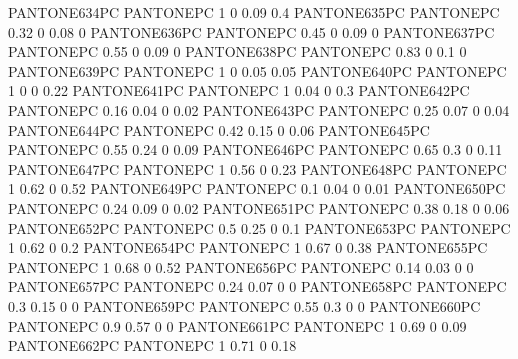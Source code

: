  {PANTONE634PC} {PANTONE\SpotSpace PC} {1 0 0.09 0.4}
 {PANTONE635PC} {PANTONE\SpotSpace PC} {0.32 0 0.08 0}
 {PANTONE636PC} {PANTONE\SpotSpace PC} {0.45 0 0.09 0}
 {PANTONE637PC} {PANTONE\SpotSpace PC} {0.55 0 0.09 0}
 {PANTONE638PC} {PANTONE\SpotSpace PC} {0.83 0 0.1 0}
 {PANTONE639PC} {PANTONE\SpotSpace PC} {1 0 0.05 0.05}
 {PANTONE640PC} {PANTONE\SpotSpace PC} {1 0 0 0.22}
 {PANTONE641PC} {PANTONE\SpotSpace PC} {1 0.04 0 0.3}
 {PANTONE642PC} {PANTONE\SpotSpace PC} {0.16 0.04 0 0.02}
 {PANTONE643PC} {PANTONE\SpotSpace PC} {0.25 0.07 0 0.04}
 {PANTONE644PC} {PANTONE\SpotSpace PC} {0.42 0.15 0 0.06}
 {PANTONE645PC} {PANTONE\SpotSpace PC} {0.55 0.24 0 0.09}
 {PANTONE646PC} {PANTONE\SpotSpace PC} {0.65 0.3 0 0.11}
 {PANTONE647PC} {PANTONE\SpotSpace PC} {1 0.56 0 0.23}
 {PANTONE648PC} {PANTONE\SpotSpace PC} {1 0.62 0 0.52}
 {PANTONE649PC} {PANTONE\SpotSpace PC} {0.1 0.04 0 0.01}
 {PANTONE650PC} {PANTONE\SpotSpace PC} {0.24 0.09 0 0.02}
 {PANTONE651PC} {PANTONE\SpotSpace PC} {0.38 0.18 0 0.06}
 {PANTONE652PC} {PANTONE\SpotSpace PC} {0.5 0.25 0 0.1}
 {PANTONE653PC} {PANTONE\SpotSpace PC} {1 0.62 0 0.2}
 {PANTONE654PC} {PANTONE\SpotSpace PC} {1 0.67 0 0.38}
 {PANTONE655PC} {PANTONE\SpotSpace PC} {1 0.68 0 0.52}
 {PANTONE656PC} {PANTONE\SpotSpace PC} {0.14 0.03 0 0}
 {PANTONE657PC} {PANTONE\SpotSpace PC} {0.24 0.07 0 0}
 {PANTONE658PC} {PANTONE\SpotSpace PC} {0.3 0.15 0 0}
 {PANTONE659PC} {PANTONE\SpotSpace PC} {0.55 0.3 0 0}
 {PANTONE660PC} {PANTONE\SpotSpace PC} {0.9 0.57 0 0}
 {PANTONE661PC} {PANTONE\SpotSpace PC} {1 0.69 0 0.09}
 {PANTONE662PC} {PANTONE\SpotSpace PC} {1 0.71 0 0.18}
